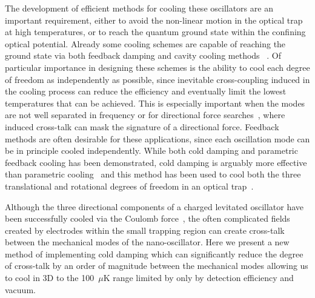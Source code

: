 \documentclass[aps,pra,twocolumn,nopacs,superscriptaddress,groupedaddress]{revtex4}
\begin{document}
The development of efficient methods for cooling these oscillators are an important requirement, either to avoid the non-linear motion in the optical trap at high temperatures, or to reach the quantum ground state within the confining optical potential.  Already some cooling schemes are capable of reaching the ground state via both feedback damping and cavity cooling methods ~\cite{tebbenjohanns2019cold,tebbenjohanns2020motional,kamba2021recoil,dania2021optical,kamba2022optical,vijayan2023scalable,liska2023cold}. 
Of particular importance in designing these schemes is the ability to cool each degree of freedom as independently as possible, since inevitable cross-coupling induced in the cooling process can reduce the efficiency and eventually limit the lowest temperatures that can be achieved. This is especially important when the modes are not well separated in frequency or for directional force searches~\cite{Gosling2024Sensing}, where induced cross-talk can mask the signature of a directional force. Feedback methods are often desirable for these applications, since each oscillation mode can be in principle cooled independently. While both cold damping and parametric feedback cooling has been demonstrated, cold damping is arguably more effective than parametric cooling~\cite{penny2021performance} and this method has been used to cool both the three translational and rotational degrees of freedom in an optical trap~\cite{iwasaki2019electric,kamba2023nanoscale}. 

Although the three directional components of a charged levitated oscillator have been successfully cooled via the Coulomb force~\cite{Kremer2024All}, the often complicated fields created by electrodes within the small trapping region can create cross-talk between the mechanical modes of the nano-oscillator. Here we present a new method of implementing cold damping which can significantly reduce the degree of cross-talk by an order of magnitude between the mechanical modes allowing us to cool in 3D to the 100~$\mu$K range limited by only by detection efficiency and vacuum.


\end{document}
